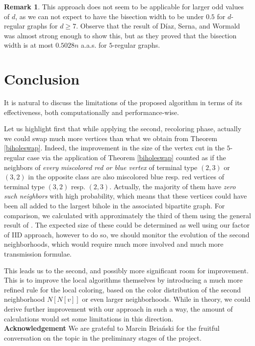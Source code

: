 \documentclass{article}
\theoremstyle{definition}
\newtheorem{remark}[definition]{Remark}
\begin{document}
\begin{remark}
This approach does not seem to be applicable for larger odd values of $d$, as we can not expect to have the bisection width to be under $0.5$ for $d$-regular graphs for $d\geq 7$. Observe that the result of Díaz, Serna, and Wormald was almost strong enough to show this, but as they proved that the bisection width is at most $0.5028n$ a.a.s. for $5$-regular graphs.
\end{remark}

\section{Conclusion}
It is natural to discuss the limitations of the proposed algorithm in terms of its effectiveness, both computationally and performance-wise.

Let us highlight first that while applying the second, recoloring phase, actually we could swap much more vertices than what we obtain from Theorem \ref{biholeswap}.
Indeed, the improvement in the size of the vertex cut in the $5$-regular case via the application of Theorem \ref{biholeswap} counted as if the neighbors of\textit{ every miscolored red or blue vertex} of terminal type $(2,3)$ or $(3,2)$ in the opposite class are also miscolored  blue resp. red vertices of terminal type $(3,2)$ resp. $(2,3)$. Actually, 
the majority of them have \textit{zero such neighbors} with high probability, which means that these vertices could have been all added to the largest bihole in the associated bipartite graph. For comparison, we calculated with approximately the third of them using the general result of \cite{axenovich2021bipartite}.
The expected size of these could be determined as well using our factor of IID approach, however to do so, we should monitor the evolution of the second neighborhoods, which would require much more involved and much more transmission formulae.

This leads us to the second, and possibly more significant room for improvement. 
This is to improve the local algorithms themselves by introducing a much more refined rule for the local coloring, based on the color distribution of the second neighborhood $N[N[v]]$ or even larger neighborhoods. 
While in theory, we could derive further improvement with our approach in such a way, the amount of calculations would set some limitations in this direction.\\

\textbf{Acknowledgement} We are grateful to Marcin Bria\'nski for the fruitful conversation on the topic in the preliminary stages of the project. 



\end{document}
